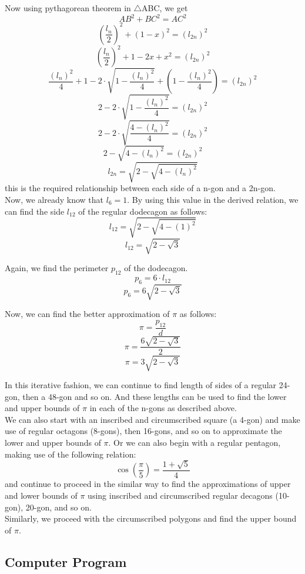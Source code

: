 \documentclass[12pt]{article}
\begin{document}
Now using pythagorean theorem in $\bigtriangleup$ABC, we get\\
$$AB^{2}+BC^{2}=AC^{2}$$
$$(\frac{l_{n}}{2})^{2}+(1-x)^{2} = (l_{2n})^{2}$$
$$(\frac{l_{n}}{2})^{2} + 1-2x+x^{2} = (l_{2n})^{2}$$
$$\frac{(l_{n})^{2}}{4}+1-2\cdot\sqrt{1-\frac{(l_{n})^{2}}{4}}+(1-\frac{(l_{n})^{2}}{4})=(l_{2n})^{2}$$
$$2-2\cdot\sqrt{1-\frac{(l_{n})^{2}}{4}}=(l_{2n})^{2}$$
$$2-2\cdot\sqrt{\frac{4-(l_{n})^{2}}{4}}=(l_{2n})^{2}$$
$$2-\sqrt{4-(l_{n})^{2}}=(l_{2n})^{2}$$
$$l_{2n}=\sqrt{2-\sqrt{4-(l_{n})^{2}}}$$
this is the required relationship between each side of a n-gon and a 2n-gon.\\


Now, we already know that $l_{6}=1$. By using this value in the derived relation, we can find the side $l_{12}$ of the regular dodecagon as follows:\\
$$l_{12} = \sqrt{2-\sqrt{4-(1)^{2}}}$$
$$l_{12} = \sqrt{2-\sqrt{3}}$$

Again, we find the perimeter $p_{12}$ of the dodecagon.
$$p_{6}=6\cdot l_{12}$$
$$p_{6}=6\sqrt{2-\sqrt{3}}$$

Now, we can find the better approximation of $\pi$ as follows:
$$\pi = \frac{p_{12}}{d}$$
$$\pi = \frac{6\sqrt{2-\sqrt{3}}}{2}$$
$$\pi = 3\sqrt{2-\sqrt{3}}$$

In this iterative fashion, we can continue to find length of sides of a regular 24-gon, then a 48-gon and so on. And these lengths can be used to find the lower and upper bounds of $\pi$ in each of the n-gons as described above.\\

We can also start with an inscribed and circumscribed square (a 4-gon) and make use of regular octagons (8-gons), then 16-gons, and so on to approximate the lower and upper bounds of $\pi$. Or we can also begin with a regular pentagon, making use of the following relation:
$$\cos(\frac{\pi}{5})=\frac{1+\sqrt{5}}{4}$$
and continue to proceed in the similar way to find the approximations of upper and lower bounds of $\pi$ using inscribed and circumscribed regular decagons (10-gon), 20-gon, and so on.\\

Similarly, we proceed with the circumscribed polygons and find the upper bound of $\pi$.

\subsection{Computer Program}  
\end{document}
